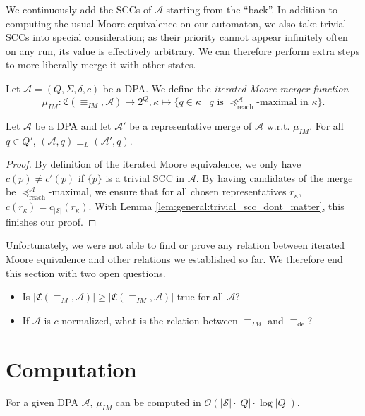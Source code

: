 We continuously add the SCCs of $\mathcal{A}$ starting from the \enquote{back}. In addition to computing the usual Moore equivalence on our automaton, we also take trivial SCCs into special consideration; as their priority cannot appear infinitely often on any run, its value is effectively arbitrary. We can therefore perform extra steps to more liberally merge it with other states.


\begin{defn}
	Let $\mathcal{A} = (Q, \Sigma, \delta, c)$ be a DPA. We define the \emph{iterated Moore merger function} $$\mu_{IM} : \mathfrak{C}(\equiv_{IM}, \mathcal{A}) \rightarrow 2^Q, \kappa \mapsto \{ q \in \kappa \mid q \text{ is } \preceq_\text{reach}^\mathcal{A} \text{-maximal in } \kappa \}.$$
\end{defn}

\begin{theorem}
	Let $\mathcal{A}$ be a DPA and let $\mathcal{A}'$ be a representative merge of $\mathcal{A}$ w.r.t. $\mu_{IM}$. For all $q \in Q'$, $(\mathcal{A}, q) \equiv_L (\mathcal{A}', q)$.
\end{theorem}

\begin{proof}
	By definition of the iterated Moore equivalence, we only have $c(p) \neq c'(p)$ if $\{p\}$ is a trivial SCC in $\mathcal{A}$. By having candidates of the merge be $\preceq_\text{reach}^\mathcal{A}$-maximal, we ensure that for all chosen representatives $r_\kappa$, $c(r_\kappa) = c_{|\mathcal{S}|}(r_\kappa)$. With Lemma \ref{lem:general:trivial_scc_dont_matter}, this finishes our proof.
\end{proof}

\vspace{10pt}

Unfortunately, we were not able to find or prove any relation between iterated Moore equivalence and other relations we established so far. We therefore end this section with two open questions.

\begin{itemize}
	\item Is $|\mathfrak{C}(\equiv_M, \mathcal{A})| \geq |\mathfrak{C}(\equiv_{IM}, \mathcal{A})|$ true for all $\mathcal{A}$?
	\item If $\mathcal{A}$ is $c$-normalized, what is the relation between $\equiv_{IM}$ and $\equiv_\text{de}$?
\end{itemize}


\section{Computation}
\begin{lem}
	For a given DPA $\mathcal{A}$, $\mu_{IM}$ can be computed in $\mathcal{O}(|\mathcal{S}| \cdot |Q| \cdot \log |Q|)$.
\end{lem}

